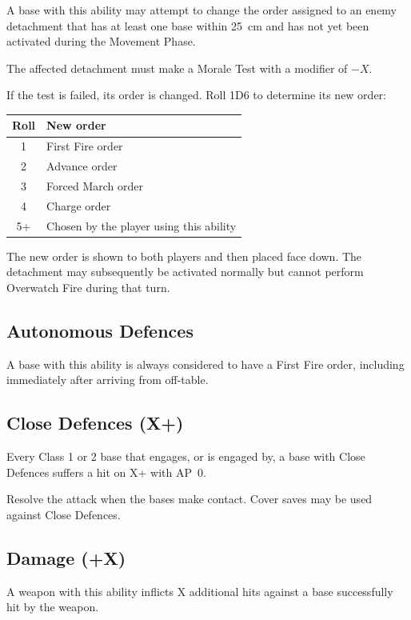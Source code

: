 A base with this ability may attempt to change the order assigned to an enemy detachment that has at least one base within 25~cm and has not yet been activated during the Movement Phase.

The affected detachment must make a Morale Test with a modifier of $-X$.

If the test is failed, its order is changed. Roll 1D6 to determine its new order:

\begin{center}
    \begin{tabular}{c l}
        \textbf{Roll} & \textbf{New order} \\
        \hline
        1  & First Fire order \\
        2  & Advance order \\
        3  & Forced March order \\
        4  & Charge order \\
        5+ & Chosen by the player using this ability
    \end{tabular}
\end{center}

The new order is shown to both players and then placed face down. The detachment may subsequently be activated normally but cannot perform Overwatch Fire during that turn.

\subsection{Autonomous Defences}

A base with this ability is always considered to have a First Fire order, including immediately after arriving from off-table.

\subsection{Close Defences (X+)}

Every Class 1 or 2 base that engages, or is engaged by, a base with Close Defences suffers a hit on X+ with AP~0.

Resolve the attack when the bases make contact. Cover saves may be used against Close Defences.

\subsection{Damage (+X)}

A weapon with this ability inflicts X additional hits against a base successfully hit by the weapon.

